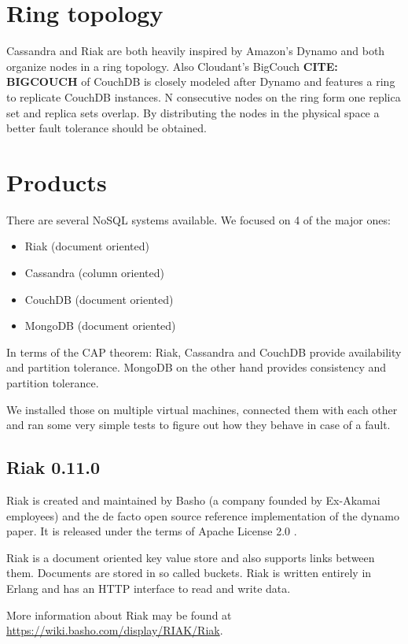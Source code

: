 \section{Ring topology}

Cassandra and Riak are both heavily inspired by Amazon's Dynamo and
both organize nodes in a ring topology. Also Cloudant's BigCouch
\textbf{CITE: BIGCOUCH} of CouchDB is closely modeled after Dynamo
and features a ring to replicate CouchDB instances. N consecutive
nodes on the ring form one replica set and replica sets overlap. By
distributing the nodes in the physical space a better fault
tolerance should be obtained.

\section{Products}

There are several NoSQL systems available. We focused on 4 of the
major ones:

\begin{itemize}
\item
  Riak (document oriented)
\item
  Cassandra (column oriented)
\item
  CouchDB (document oriented)
\item
  MongoDB (document oriented)
\end{itemize}
In terms of the CAP theorem: Riak, Cassandra and CouchDB provide
availability and partition tolerance. MongoDB on the other hand
provides consistency and partition tolerance.

We installed those on multiple virtual machines, connected them
with each other and ran some very simple tests to figure out how
they behave in case of a fault.

\subsection{Riak 0.11.0}

Riak is created and maintained by Basho (a company founded by
Ex-Akamai employees) and the de facto open source reference
implementation of the dynamo paper. It is released under the terms
of Apache License 2.0 .

Riak is a document oriented key value store and also supports links
between them. Documents are stored in so called buckets. Riak is
written entirely in Erlang and has an HTTP interface to read and
write data.

More information about Riak may be found at
\url{https://wiki.basho.com/display/RIAK/Riak}.

